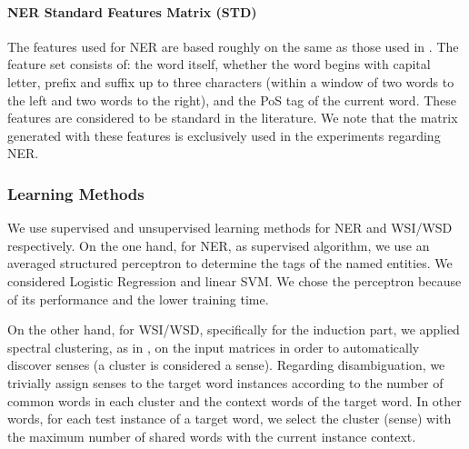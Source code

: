 \paragraph{NER Standard Features Matrix (STD)}
The features used for NER are based roughly on the same as those used in \cite{Daume2006,Balasuriya2009}. The feature set consists of: the word itself, whether the word begins with capital letter, prefix and suffix up to three characters (within a window of two words to the left and two words to the right), and the PoS tag of the current word. These features are considered to be standard in the literature. We note that the matrix generated with these features is exclusively used in the experiments regarding NER.	

\subsubsection{Learning Methods}
We use supervised and unsupervised learning methods for NER and WSI/WSD respectively. On the one hand, for NER, as supervised algorithm, we use an averaged structured perceptron \cite{Collins2002,Daume2006} to determine the tags of the named entities. We considered Logistic Regression and linear SVM. We chose the perceptron because of its performance and the lower training time.

On the other hand, for WSI/WSD, specifically for the induction part, we applied spectral clustering, as in  \cite{GoyalH14}, on the input matrices in order to automatically discover senses (a cluster is considered a sense). Regarding disambiguation, we trivially assign senses to the target word instances according to the number of common words in each cluster and the context words of the target word. In other words, for each test instance of a target word, we select the cluster (sense) with the maximum number of shared words with the current instance context.






